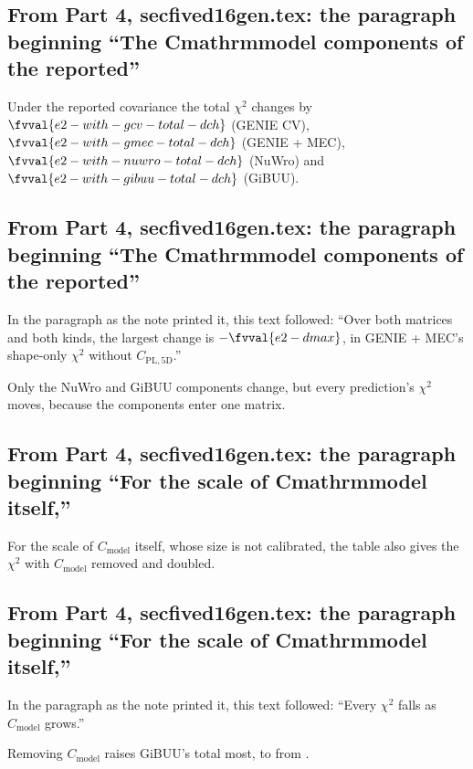 \subsection{From Part 4, secfived16gen.tex: the paragraph beginning ``The Cmathrmmodel components of the reported''}
Under the reported covariance the total $\chi^2$ changes by $\fvval{e2-with-gcv-total-dch}$ (GENIE CV), $\fvval{e2-with-gmec-total-dch}$ (GENIE + MEC), $\fvval{e2-with-nuwro-total-dch}$ (NuWro) and $\fvval{e2-with-gibuu-total-dch}$ (GiBUU).

\subsection{From Part 4, secfived16gen.tex: the paragraph beginning ``The Cmathrmmodel components of the reported''}
In the paragraph as the note printed it, this text followed: ``Over both matrices and both kinds, the largest change is $-\fvval{e2-dmax}$, in GENIE + MEC's shape-only $\chi^2$ without $C_{\mathrm{PL,5D}}$.''\par
Only the NuWro and GiBUU components change, but every prediction's $\chi^2$ moves, because the components enter one matrix.

\subsection{From Part 4, secfived16gen.tex: the paragraph beginning ``For the scale of Cmathrmmodel itself,''}
For the scale of $C_{\mathrm{model}}$ itself, whose size is not calibrated, the table also gives the $\chi^2$ with $C_{\mathrm{model}}$ removed and doubled.

\subsection{From Part 4, secfived16gen.tex: the paragraph beginning ``For the scale of Cmathrmmodel itself,''}
In the paragraph as the note printed it, this text followed: ``Every $\chi^2$ falls as $C_{\mathrm{model}}$ grows.''\par
Removing $C_{\mathrm{model}}$ raises GiBUU's total most, to  from .


